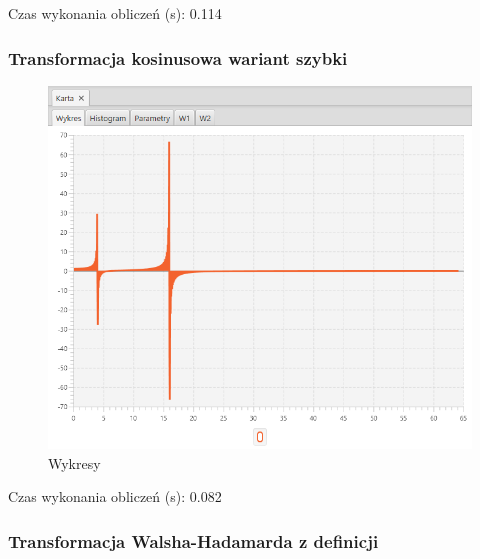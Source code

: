 \documentclass[12pt]{article}
\begin{document}
{{{                Czas wykonania obliczeń (s): 0.114
            }
            \newpage

            \subsubsection{Transformacja kosinusowa wariant szybki} {

                \begin{figure}[H]
                    \centering
                    \includegraphics[width=\textwidth]{img/result/s1/05/data_draw_5_sinus_sampling_trans_s1_data_205702.png}
                    \caption{Wykresy}
                \end{figure}

                Czas wykonania obliczeń (s): 0.082
            }
            \newpage

            \subsubsection{Transformacja Walsha-Hadamarda z definicji} {

}}}
\end{document}
